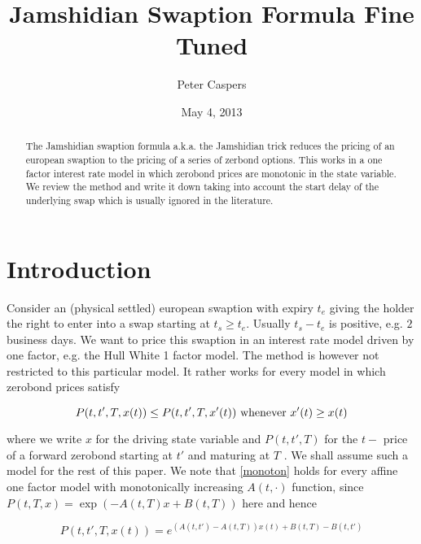 \documentclass{amsart}
\theoremstyle{plain}
\numberwithin{equation}{section}
\begin{document}

\title[Jamshidian Swaption Formula Fine Tuned]{Jamshidian Swaption Formula Fine Tuned}
\author{Peter Caspers}
\date{May 4, 2013}
\begin{abstract}
The Jamshidian swaption formula a.k.a. the Jamshidian trick reduces the pricing of an european swaption to the pricing of a series of
zerbond options. This works in a one factor interest rate model in which zerobond prices are monotonic in the state variable. We review
the method and write it down taking into account the start delay of the underlying swap which is usually ignored in the literature.
\end{abstract}

\maketitle

\section{Introduction}

Consider an (physical settled) european swaption with expiry $t_e$ giving the holder the right to enter into a swap starting at $t_s \geq t_e$. Usually $t_s-t_e$
is positive, e.g. $2$ business days. We want to price this swaption in an interest rate model driven by one factor, e.g. the Hull White 1 factor model.
The method is however not restricted to this particular model. It rather works for every model in which zerobond prices satisfy

\begin{equation}\label{monoton}
P(t,t',T,x(t)) \leq P(t,t',T,x'(t)) \textnormal{ whenever } x'(t) \geq x(t)
\end{equation}

where we write $x$ for the driving state variable and $P(t,t',T)$ for the $t-$ price of a forward zerobond starting at $t'$ and maturing at $T$ . We shall assume such a model for the rest of this paper. We note that \ref{monoton} holds for every affine one factor model with monotonically increasing $A(t,\cdot)$ function, since $P(t,T,x)=\exp(-A(t,T)x+B(t,T))$ here and hence

\begin{equation}
P(t,t',T,x(t)) = e^{(A(t,t')-A(t,T))x(t)+B(t,T)-B(t,t')}
\end{equation}
\end{document}
